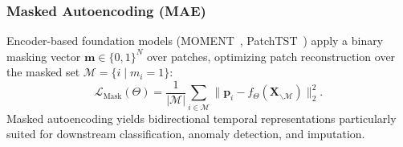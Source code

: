 \subsubsection{Masked Autoencoding (MAE)}
Encoder-based foundation models (MOMENT~\cite{goswami2024moment}, PatchTST~\cite{nie2023patchtst}) apply a binary masking vector $\mathbf{m} \in \{0, 1\}^N$ over patches, optimizing patch reconstruction over the masked set $\mathcal{M} = \{i \mid m_i = 1\}$:
\begin{equation}
    \mathcal{L}_{\text{Mask}}(\Theta) = \frac{1}{|\mathcal{M}|} \sum_{i \in \mathcal{M}} \|\mathbf{p}_i - f_\Theta(\mathbf{X}_{\backslash \mathcal{M}})\|_2^2.
\end{equation}
Masked autoencoding yields bidirectional temporal representations particularly suited for downstream classification, anomaly detection, and imputation.
